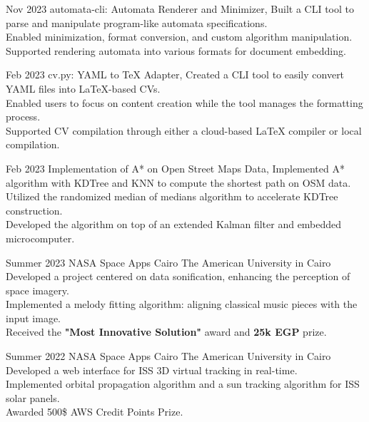 \documentclass[]{report}
\begin{document}
\entry
    {Nov 2023}
    {automata-cli: Automata Renderer and Minimizer, }
    {} {}
    {
        \tb Built a CLI tool to parse and manipulate program-like automata specifications. \\ 
        \tb Enabled minimization, format conversion, and custom algorithm manipulation. \\ 
        \tb Supported rendering automata into various formats for document embedding.
    }

\entry
    {Feb 2023}
    {cv.py: YAML to TeX Adapter, }
    {} {}  
    {
        \tb Created a CLI tool to easily convert YAML files into LaTeX-based CVs.\\
        \tb Enabled users to focus on content creation while the tool manages the formatting process.\\
        \tb Supported CV compilation through either a cloud-based LaTeX compiler or local compilation.
    }

\entry
    {Feb 2023}
    {Implementation of A* on Open Street Maps Data, }
    {} {}    
    {
       \tb Implemented A* algorithm with KDTree and KNN to compute the shortest path on OSM data.\\
       \tb Utilized the randomized median of medians algorithm to accelerate KDTree construction. \\
       \tb Developed the algorithm on top of an extended Kalman filter and embedded microcomputer.
    }


\entry
    {Summer 2023}
    {NASA Space Apps Cairo}
    {The American University in Cairo }{}
    {
        \tb Developed a project centered on data sonification, enhancing the perception of space imagery.\\
        \tb Implemented a melody fitting algorithm: aligning classical music pieces with the input image.\\
        \tb Received the \textbf{"Most Innovative Solution"} award and \textbf{25k EGP} prize.
    }
    
\entry 
    {Summer 2022}
    {NASA Space Apps Cairo}
    {The American University in Cairo }{}
    { 
        \tb Developed a web interface for ISS 3D virtual tracking in real-time. \\
        \tb Implemented orbital propagation algorithm and a sun tracking algorithm for ISS solar panels.\\
        \tb Awarded 500\$ AWS Credit Points Prize.
    }
\end{document}
